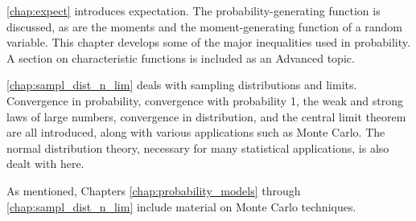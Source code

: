 \autoref{chap:expect} introduces expectation. The probability-generating function is discussed, as are the moments and the moment-generating function of a random variable. This chapter develops some of the major inequalities used in probability. A section on characteristic functions is included as an Advanced topic.

\autoref{chap:sampl_dist_n_lim} deals with sampling distributions and limits. Convergence in probability, convergence with probability 1, the weak and strong laws of large numbers, convergence in distribution, and the central limit theorem are all introduced, along with various applications such as Monte Carlo. The normal distribution theory, necessary  for  many statistical applications, is also dealt with here.

As mentioned, Chapters \ref{chap:probability_models} through \ref{chap:sampl_dist_n_lim} include material on Monte Carlo techniques.